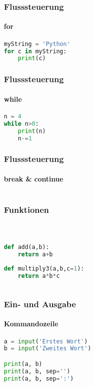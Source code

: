 \documentclass[12pt,ngerman]{beamer}
\begin{document}
\begin{frame}[fragile]
\frametitle{Flusssteuerung}
\framesubtitle{for}

\begin{lstlisting}[language={Python},caption={for}]
myString = 'Python'
for c in myString:
	print(c)
\end{lstlisting}

\end{frame}

\begin{frame}[fragile]
\frametitle{Flusssteuerung}
\framesubtitle{while}

\begin{lstlisting}[language={Python},caption={while}]
n = 4
while n>0:
	print(n)
	n-=1
\end{lstlisting}

\end{frame}

\begin{frame}[fragile]
\frametitle{Flusssteuerung}
\framesubtitle{break \& continue}

\begin{lstlisting}[language={Python},caption={break \& continue}]

\end{lstlisting}

\end{frame}


\begin{frame}[fragile]
\frametitle{Funktionen}
\framesubtitle{~}

\begin{lstlisting}[language={Python},caption={Definition von Funktionen}]
def add(a,b):
	return a+b
	
def multiply3(a,b,c=1):
	return a*b*c
	
\end{lstlisting}

\end{frame}


\begin{frame}[fragile]
\frametitle{Ein- und Ausgabe}
\framesubtitle{Kommandozeile}

\begin{lstlisting}[language={Python},caption={Ein- und Ausgabe: Kommandozeile}]
a = input('Erstes Wort')
b = input('Zweites Wort')

print(a, b)
print(a, b, sep='')
print(a, b, sep=':')
\end{lstlisting}
\end{frame}
\end{document}
